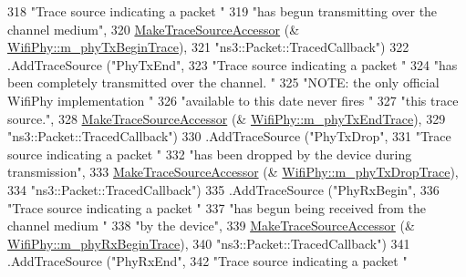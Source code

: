 \begin{DoxyCode}
318                      \textcolor{stringliteral}{"Trace source indicating a packet "}
319                      \textcolor{stringliteral}{"has begun transmitting over the channel medium"},
320                      \hyperlink{group__tracing_gab21a770b9855af4e8f69f7531ea4a6b0}{MakeTraceSourceAccessor} (&
      \hyperlink{classns3_1_1WifiPhy_adf60437bb052fa372a0cfa487a705620}{WifiPhy::m\_phyTxBeginTrace}),
321                      \textcolor{stringliteral}{"ns3::Packet::TracedCallback"})
322     .AddTraceSource (\textcolor{stringliteral}{"PhyTxEnd"},
323                      \textcolor{stringliteral}{"Trace source indicating a packet "}
324                      \textcolor{stringliteral}{"has been completely transmitted over the channel. "}
325                      \textcolor{stringliteral}{"NOTE: the only official WifiPhy implementation "}
326                      \textcolor{stringliteral}{"available to this date never fires "}
327                      \textcolor{stringliteral}{"this trace source."},
328                      \hyperlink{group__tracing_gab21a770b9855af4e8f69f7531ea4a6b0}{MakeTraceSourceAccessor} (&
      \hyperlink{classns3_1_1WifiPhy_a89be9fb17763c992ab79667c877db0bb}{WifiPhy::m\_phyTxEndTrace}),
329                      \textcolor{stringliteral}{"ns3::Packet::TracedCallback"})
330     .AddTraceSource (\textcolor{stringliteral}{"PhyTxDrop"},
331                      \textcolor{stringliteral}{"Trace source indicating a packet "}
332                      \textcolor{stringliteral}{"has been dropped by the device during transmission"},
333                      \hyperlink{group__tracing_gab21a770b9855af4e8f69f7531ea4a6b0}{MakeTraceSourceAccessor} (&
      \hyperlink{classns3_1_1WifiPhy_a17b4a316c4fd6feac22b5abb38da689e}{WifiPhy::m\_phyTxDropTrace}),
334                      \textcolor{stringliteral}{"ns3::Packet::TracedCallback"})
335     .AddTraceSource (\textcolor{stringliteral}{"PhyRxBegin"},
336                      \textcolor{stringliteral}{"Trace source indicating a packet "}
337                      \textcolor{stringliteral}{"has begun being received from the channel medium "}
338                      \textcolor{stringliteral}{"by the device"},
339                      \hyperlink{group__tracing_gab21a770b9855af4e8f69f7531ea4a6b0}{MakeTraceSourceAccessor} (&
      \hyperlink{classns3_1_1WifiPhy_ac33ef626eeaa5283e7497bbbc8591a86}{WifiPhy::m\_phyRxBeginTrace}),
340                      \textcolor{stringliteral}{"ns3::Packet::TracedCallback"})
341     .AddTraceSource (\textcolor{stringliteral}{"PhyRxEnd"},
342                      \textcolor{stringliteral}{"Trace source indicating a packet "}

\end{DoxyCode}
